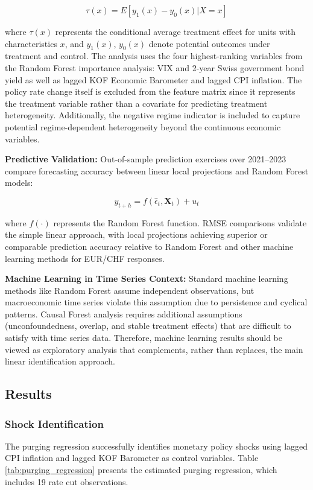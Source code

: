 \documentclass[12pt,a4paper]{article}
\begin{document}
\begin{equation}
	\tau(x) = E[y_1(x) - y_0(x) | X = x]
	\label{eq:causal_forest}
\end{equation}

where $\tau(x)$ represents the conditional average treatment effect for units with characteristics $x$, and $y_1(x)$, $y_0(x)$ denote potential outcomes under treatment and control. The analysis uses the four highest-ranking variables from the Random Forest importance analysis: VIX and 2-year Swiss government bond yield as well as lagged KOF Economic Barometer and lagged CPI inflation. The policy rate change itself is excluded from the feature matrix since it represents the treatment variable rather than a covariate for predicting treatment heterogeneity. Additionally, the negative regime indicator is included to capture potential regime-dependent heterogeneity beyond the continuous economic variables.

\textbf{Predictive Validation:} Out-of-sample prediction exercises over 2021--2023 compare forecasting accuracy between linear local projections and Random Forest models:

\begin{equation}
	y_{t+h} = f(\hat{\epsilon}_t, \mathbf{X}_t) + u_t
	\label{eq:random_forest}
\end{equation}

where $f(\cdot)$ represents the Random Forest function. RMSE comparisons validate the simple linear approach, with local projections achieving superior or comparable prediction accuracy relative to Random Forest and other machine learning methods for EUR/CHF responses.

\textbf{Machine Learning in Time Series Context:} Standard machine learning methods like Random Forest assume independent observations, but macroeconomic time series violate this assumption due to persistence and cyclical patterns. Causal Forest analysis requires additional assumptions (unconfoundedness, overlap, and stable treatment effects) that are difficult to satisfy with time series data. Therefore, machine learning results should be viewed as exploratory analysis that complements, rather than replaces, the main linear identification approach.
\newpage
\subsection{Results}
\label{subsec:empirical_results}
\subsubsection{Shock Identification}
The purging regression successfully identifies monetary policy shocks using lagged CPI inflation and lagged KOF Barometer as control variables. Table \ref{tab:purging_regression} presents the estimated purging regression, which includes 19 rate cut observations.
\end{document}
